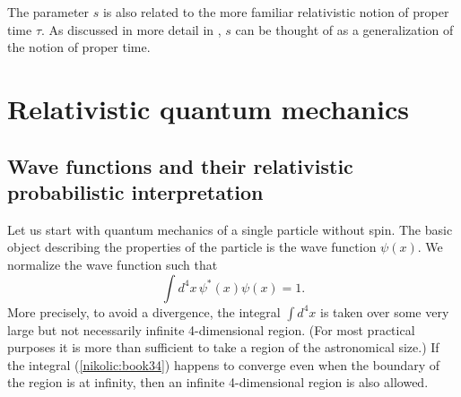 \documentclass[12pt,twoside]{report} %
\begin{document}
The parameter $s$ is also related to the more familiar relativistic notion of proper time $\tau$.
As discussed in more detail in \cite{nikscalpot}, $s$ can be thought of as a generalization
of the notion of proper time.





\section{Relativistic quantum mechanics}
\label{nikolic:RQ}

\subsection{Wave functions and their relativistic probabilistic interpretation}
\label{nikolic:RQ1}

Let us start with quantum mechanics of a single particle without spin.
The basic object describing the properties of the particle is the wave function
$\psi(x)$. We normalize the wave function such that
\begin{equation}\label{nikolic:book34}
\int d^4x \, \psi^*(x)\psi(x)=1 .
\end{equation}
More precisely, to avoid a divergence,
the integral $\int d^4x$ is taken over some very large but not necessarily
infinite 4-dimensional region. (For most practical purposes it is 
more than sufficient
to take a region of the astronomical size.) If the integral (\ref{nikolic:book34})
happens to converge
even when the boundary of the region is at infinity, then an infinite 4-dimensional
region is also allowed.
\end{document}
